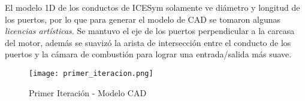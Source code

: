 El modelo 1D de los conductos de ICESym solamente ve diámetro y longitud  de los
puertos, por lo que para generar el modelo de CAD se tomaron algunas
\emph{licencias artísticas}.
%
Se mantuvo el eje de los puertos perpendicular a la carcasa del motor, además se
suavizó la arista de intersección entre el conducto de los puertos y la cámara
de combustión para lograr una entrada/salida más suave.

\begin{figure}
  \centering
  \texttt{[image: primer\_iteracion.png]}
  \caption{Primer Iteración - Modelo CAD}
  \label{fig:primer_it}
\end{figure}
